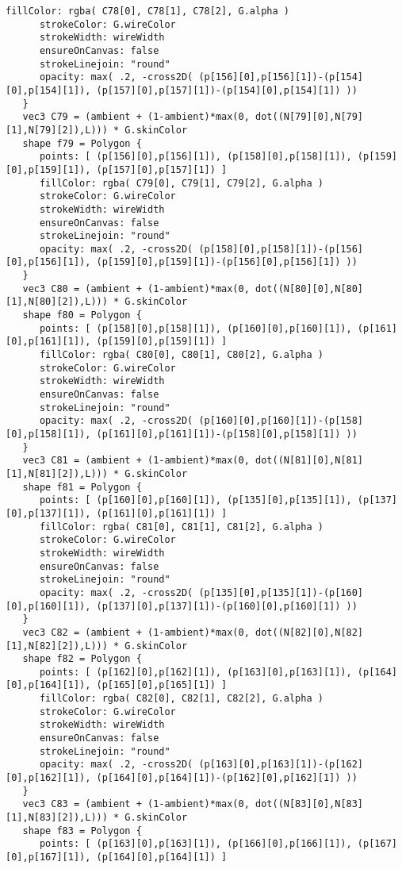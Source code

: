 \begin{lstlisting}[language=Sty-RT,escapechar=@]
      fillColor: rgba( C78[0], C78[1], C78[2], G.alpha )
      strokeColor: G.wireColor
      strokeWidth: wireWidth
      ensureOnCanvas: false
      strokeLinejoin: "round"
      opacity: max( .2, -cross2D( (p[156][0],p[156][1])-(p[154][0],p[154][1]), (p[157][0],p[157][1])-(p[154][0],p[154][1]) ))
   }
   vec3 C79 = (ambient + (1-ambient)*max(0, dot((N[79][0],N[79][1],N[79][2]),L))) * G.skinColor
   shape f79 = Polygon {
      points: [ (p[156][0],p[156][1]), (p[158][0],p[158][1]), (p[159][0],p[159][1]), (p[157][0],p[157][1]) ]
      fillColor: rgba( C79[0], C79[1], C79[2], G.alpha )
      strokeColor: G.wireColor
      strokeWidth: wireWidth
      ensureOnCanvas: false
      strokeLinejoin: "round"
      opacity: max( .2, -cross2D( (p[158][0],p[158][1])-(p[156][0],p[156][1]), (p[159][0],p[159][1])-(p[156][0],p[156][1]) ))
   }
   vec3 C80 = (ambient + (1-ambient)*max(0, dot((N[80][0],N[80][1],N[80][2]),L))) * G.skinColor
   shape f80 = Polygon {
      points: [ (p[158][0],p[158][1]), (p[160][0],p[160][1]), (p[161][0],p[161][1]), (p[159][0],p[159][1]) ]
      fillColor: rgba( C80[0], C80[1], C80[2], G.alpha )
      strokeColor: G.wireColor
      strokeWidth: wireWidth
      ensureOnCanvas: false
      strokeLinejoin: "round"
      opacity: max( .2, -cross2D( (p[160][0],p[160][1])-(p[158][0],p[158][1]), (p[161][0],p[161][1])-(p[158][0],p[158][1]) ))
   }
   vec3 C81 = (ambient + (1-ambient)*max(0, dot((N[81][0],N[81][1],N[81][2]),L))) * G.skinColor
   shape f81 = Polygon {
      points: [ (p[160][0],p[160][1]), (p[135][0],p[135][1]), (p[137][0],p[137][1]), (p[161][0],p[161][1]) ]
      fillColor: rgba( C81[0], C81[1], C81[2], G.alpha )
      strokeColor: G.wireColor
      strokeWidth: wireWidth
      ensureOnCanvas: false
      strokeLinejoin: "round"
      opacity: max( .2, -cross2D( (p[135][0],p[135][1])-(p[160][0],p[160][1]), (p[137][0],p[137][1])-(p[160][0],p[160][1]) ))
   }
   vec3 C82 = (ambient + (1-ambient)*max(0, dot((N[82][0],N[82][1],N[82][2]),L))) * G.skinColor
   shape f82 = Polygon {
      points: [ (p[162][0],p[162][1]), (p[163][0],p[163][1]), (p[164][0],p[164][1]), (p[165][0],p[165][1]) ]
      fillColor: rgba( C82[0], C82[1], C82[2], G.alpha )
      strokeColor: G.wireColor
      strokeWidth: wireWidth
      ensureOnCanvas: false
      strokeLinejoin: "round"
      opacity: max( .2, -cross2D( (p[163][0],p[163][1])-(p[162][0],p[162][1]), (p[164][0],p[164][1])-(p[162][0],p[162][1]) ))
   }
   vec3 C83 = (ambient + (1-ambient)*max(0, dot((N[83][0],N[83][1],N[83][2]),L))) * G.skinColor
   shape f83 = Polygon {
      points: [ (p[163][0],p[163][1]), (p[166][0],p[166][1]), (p[167][0],p[167][1]), (p[164][0],p[164][1]) ]

\end{lstlisting}
